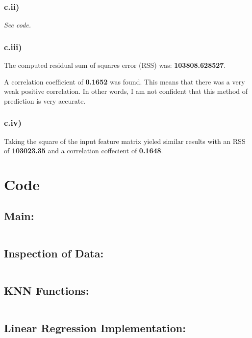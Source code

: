 \documentclass[12pt]{article}
\let\Oldsection\section
\renewcommand{\section}{\FloatBarrier\Oldsection}
\let\Oldsubsection\subsection
\renewcommand{\subsection}{\FloatBarrier\Oldsubsection}
\let\Oldsubsubsection\subsubsection
\renewcommand{\subsubsection}{\FloatBarrier\Oldsubsubsection}
\begin{document}
	\subsubsection*{c.ii)}
	\textit{See code.}

	\subsubsection*{c.iii)}
	The computed residual sum of squares error (RSS) was: \textbf{103808.628527}.

	A correlation coefficient of \textbf{0.1652} was found. This means that there
	was a very weak positive correlation. In other words, I am not confident that
	this method of prediction is very accurate.

	\subsubsection*{c.iv)}
	Taking the square of the input feature matrix yieled similar results
	with an RSS of \textbf{103023.35} and a correlation 
	coffecient of \textbf{0.1648}.

\section*{Code}

\subsection*{Main: }
\inputminted{python}{../main.py}

\subsection*{Inspection of Data:}
\inputminted{python}{../inspection.py}

\subsection*{KNN Functions:}
\inputminted{python}{../KNN.py}

\subsection*{Linear Regression Implementation:}
\inputminted{python}{../linear_regression.py}
\end{document}
